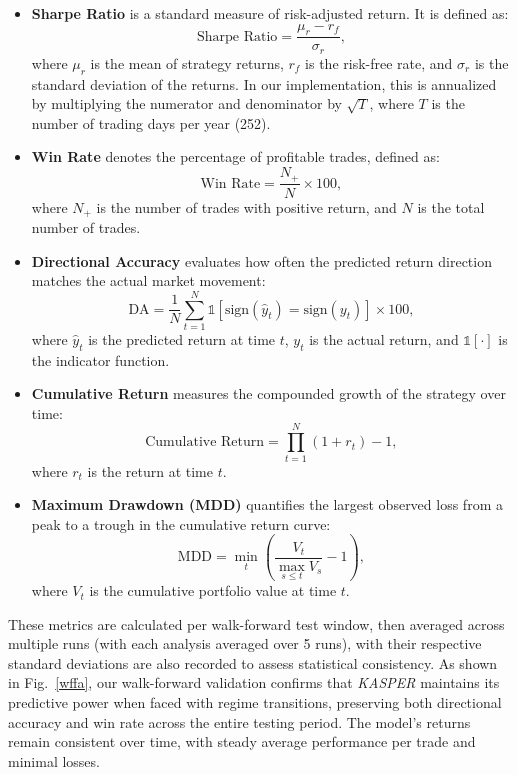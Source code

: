 \documentclass[conference,10pt]{IEEEtran}
\begin{document}
\begin{itemize}
    \item \textbf{Sharpe Ratio} is a standard measure of risk-adjusted return. It is defined as:
    \begin{equation}
        \text{Sharpe Ratio} = \frac{\mu_r - r_f}{\sigma_r},
    \end{equation}
where $\mu_r$ is the mean of strategy returns, $r_f$ is the risk-free rate, and $\sigma_r$ is the standard deviation of the returns. In our implementation, this is annualized by multiplying the numerator and denominator by $\sqrt{T}$, where $T$ is the number of trading days per year (252).
    \item \textbf{Win Rate} denotes the percentage of profitable trades, defined as:
    \begin{equation}
        \text{Win Rate} = \frac{N_{+}}{N} \times 100,
    \end{equation}
where $N_{+}$ is the number of trades with positive return, and $N$ is the total number of trades.
    \item \textbf{Directional Accuracy} evaluates how often the predicted return direction matches the actual market movement:
    \begin{equation}
        \text{DA} = \frac{1}{N} \sum_{t=1}^{N} \mathbb{1}\left[\text{sign}(\hat{y}_t) = \text{sign}(y_t)\right] \times 100,
\end{equation}
where $\hat{y}_t$ is the predicted return at time $t$, $y_t$ is the actual return, and $\mathbb{1}[\cdot]$ is the indicator function.

    \item \textbf{Cumulative Return} measures the compounded growth of the strategy over time:
    \begin{equation}
        \text{Cumulative Return} = \prod_{t=1}^{N}(1 + r_t) - 1,
\end{equation}
where  $r_t$ is the return at time $t$.
    \item \textbf{Maximum Drawdown (MDD)} quantifies the largest observed loss from a peak to a trough in the cumulative return curve:
    \begin{equation}
        \text{MDD} = \min_{t} \left( \frac{V_t}{\max_{s \leq t} V_s} - 1 \right),
\end{equation}
where $V_t$ is the cumulative portfolio value at time $t$.
\end{itemize}

These metrics are calculated per walk-forward test window, then averaged across multiple runs (with each analysis averaged over 5 runs), with their respective standard deviations are also recorded to assess statistical consistency. As shown in Fig.~\ref{wffa}, our walk-forward validation confirms that \textit{KASPER} maintains its predictive power when faced with regime transitions, preserving both directional accuracy and win rate across the entire testing period. The model's returns remain consistent over time, with steady average performance per trade and minimal losses. 
\end{document}
